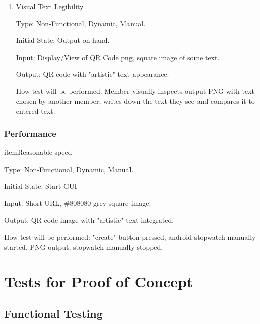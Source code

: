 \documentclass[12pt, titlepage]{article}
\begin{document}
\begin{enumerate}
\begin{enumerate}
\item{Visual Text Legibility\\}

Type: Non-Functional, Dynamic, Manual.
					
Initial State: Output on hand.
					
Input: Display/View of QR Code png, square image of some text.
					
Output: QR code with "artistic" text appearance.
					
How test will be performed: Member visually inspects output PNG with text chosen by another member, writes down the text they see and compares it to entered text.

\end{enumerate}

\subsubsection{Performance}

item{Reasonable speed\\}  %

Type: Non-Functional, Dynamic, Manual.
					
Initial State: Start GUI 
					
Input: Short URL, \#808080 grey square image.
					
Output: QR code image with "artistic" text integrated.
					
How test will be performed: "create" button pressed, android stopwatch manually started. PNG output, stopwatch manually stopped.

\end{enumerate}

\section{Tests for Proof of Concept}

\subsection{Functional Testing}
\end{document}
